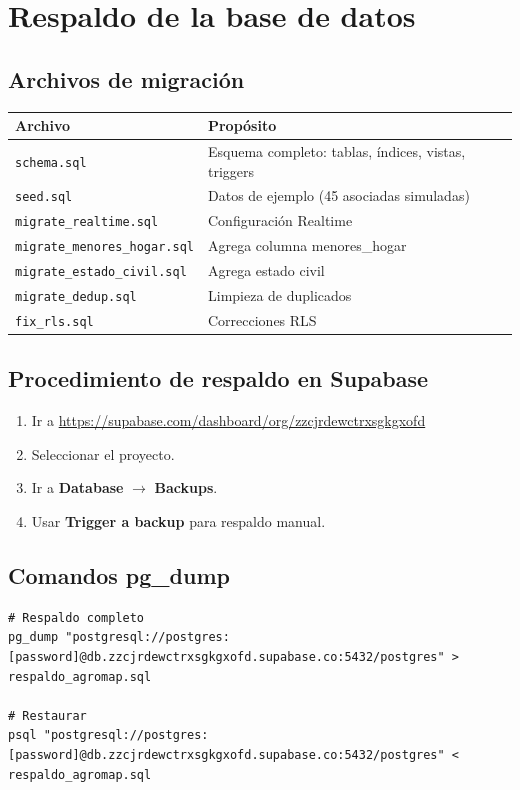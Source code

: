 \documentclass[12pt]{article}
\begin{document}
\section{Respaldo de la base de datos}

\subsection{Archivos de migraci\'on}
\begin{tabular}{ll}
  \toprule
  \textbf{Archivo} & \textbf{Prop\'osito} \\
  \midrule
  \texttt{schema.sql} & Esquema completo: tablas, \'indices, vistas, triggers \\
  \texttt{seed.sql} & Datos de ejemplo (45 asociadas simuladas) \\
  \texttt{migrate\_realtime.sql} & Configuraci\'on Realtime \\
  \texttt{migrate\_menores\_hogar.sql} & Agrega columna menores\_hogar \\
  \texttt{migrate\_estado\_civil.sql} & Agrega estado civil \\
  \texttt{migrate\_dedup.sql} & Limpieza de duplicados \\
  \texttt{fix\_rls.sql} & Correcciones RLS \\
  \bottomrule
\end{tabular}

\subsection{Procedimiento de respaldo en Supabase}
\begin{enumerate}[nosep]
  \item Ir a \url{https://supabase.com/dashboard/org/zzcjrdewctrxsgkgxofd}
  \item Seleccionar el proyecto.
  \item Ir a \textbf{Database} $\rightarrow$ \textbf{Backups}.
  \item Usar \textbf{Trigger a backup} para respaldo manual.
\end{enumerate}

\subsection{Comandos pg\_dump}
\begin{lstlisting}[style=bashstyle]
# Respaldo completo
pg_dump "postgresql://postgres:[password]@db.zzcjrdewctrxsgkgxofd.supabase.co:5432/postgres" > respaldo_agromap.sql

# Restaurar
psql "postgresql://postgres:[password]@db.zzcjrdewctrxsgkgxofd.supabase.co:5432/postgres" < respaldo_agromap.sql
\end{lstlisting}
\end{document}
